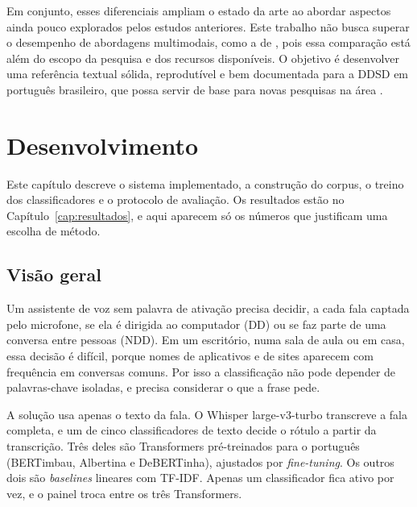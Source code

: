 \documentclass[
    12pt,                %
    openright,           %
    oneside,             %
    a4paper,             %
    english,             %
    brazil               %
]{abntex2}
\begin{document}
Em conjunto, esses diferenciais ampliam o estado da arte ao abordar aspectos ainda pouco explorados pelos estudos anteriores. Este trabalho não busca superar o desempenho de abordagens multimodais, como a de , pois essa comparação está além do escopo da pesquisa e dos recursos disponíveis. O objetivo é desenvolver uma referência textual sólida, reprodutível e bem documentada para a DDSD em português brasileiro, que possa servir de base para novas pesquisas na área \cite{Wazlawick2020, Dighe2024}.


\chapter{Desenvolvimento}
\label{cap:desenvolvimento}

Este capítulo descreve o sistema implementado, a construção do corpus, o treino dos classificadores e o protocolo de avaliação. Os resultados estão no Capítulo~\ref{cap:resultados}, e aqui aparecem só os números que justificam uma escolha de método.

\section{Visão geral}
\label{sec:visao_geral}

Um assistente de voz sem palavra de ativação precisa decidir, a cada fala captada pelo microfone, se ela é dirigida ao computador (DD) ou se faz parte de uma conversa entre pessoas (NDD). Em um escritório, numa sala de aula ou em casa, essa decisão é difícil, porque nomes de aplicativos e de sites aparecem com frequência em conversas comuns. Por isso a classificação não pode depender de palavras-chave isoladas, e precisa considerar o que a frase pede.

A solução usa apenas o texto da fala. O Whisper large-v3-turbo transcreve a fala completa, e um de cinco classificadores de texto decide o rótulo a partir da transcrição. Três deles são Transformers pré-treinados para o português (BERTimbau, Albertina e DeBERTinha), ajustados por \textit{fine-tuning}. Os outros dois são \textit{baselines} lineares com TF-IDF. Apenas um classificador fica ativo por vez, e o painel troca entre os três Transformers.
\end{document}
